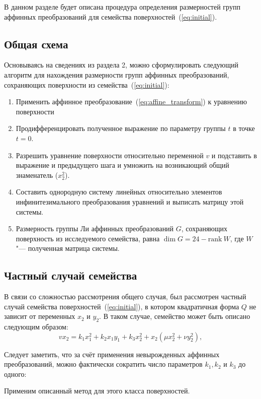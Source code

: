\documentclass[../main.tex]{subfiles}
\begin{document}
В данном разделе будет описана процедура определения размерностей групп аффинных преобразований для семейства поверхностей~(\ref{eq:initial}).
\subsection{Общая схема}
Основываясь на сведениях из раздела 2, можно сформулировать следующий алгоритм для нахождения размерности групп аффинных преобразований, сохраняющих поверхности из семейства~(\ref{eq:initial}):
\begin{enumerate}
\item Применить аффинное преобразование~(\ref{eq:affine_transform}) к уравнению поверхности
\item Продифференцировать полученное выражение по параметру группы $t$ в точке $t = 0$.
\item Разрешить уравнение поверхности относительно переменной $v$ и подставить в выражение и предыдущего шага и умножить на возникающий общий знаменатель ($x_2^2$).
\item Составить однородную систему линейных относительно элементов инфинитезимального преобразования уравнений и выписать матрицу этой системы.
\item Размерность группы Ли аффинных преобразований $G$, сохраняющих поверхность из исследуемого семейства, равна $\dim G = 24 - \mathrm{rank}~W$, где $W$ "--- полученная матрица системы.
\end{enumerate}

\subsection{Частный случай семейства}
В связи со сложностью рассмотрения общего случая, был рассмотрен частный случай семейства поверхностей~(\ref{eq:initial}), в котором квадратичная форма $Q$ не зависит от переменных $x_2$ и $y_2$. В таком случае, семейство может быть описано следующим образом:
\begin{equation}\label{eq:special}
v x_2 = k_1 x_1^2 + k_2 x_1 y_1 + k_3 x_2^2 + x_2 (\mu x_2^2 + \nu y_2^2),
\end{equation}

Следует заметить, что за счёт применения невырожденных аффинных преобразований, можно фактически сократить число параметров $k_1, k_2$ и $k_3$ до одного:

Применим описанный метод для этого класса поверхностей.
\end{document}

